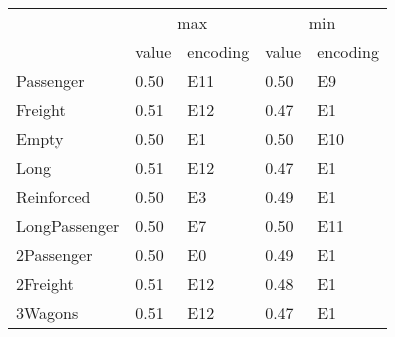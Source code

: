 \begin{tabular}{lllll}
\toprule
 & \multicolumn{2}{c}{max} & \multicolumn{2}{c}{min} \\
 & value & encoding & value & encoding \\
\midrule
Passenger & 0.50 & E11 & 0.50 & E9 \\
Freight & 0.51 & E12 & 0.47 & E1 \\
Empty & 0.50 & E1 & 0.50 & E10 \\
Long & 0.51 & E12 & 0.47 & E1 \\
Reinforced & 0.50 & E3 & 0.49 & E1 \\
LongPassenger & 0.50 & E7 & 0.50 & E11 \\
2Passenger & 0.50 & E0 & 0.49 & E1 \\
2Freight & 0.51 & E12 & 0.48 & E1 \\
3Wagons & 0.51 & E12 & 0.47 & E1 \\
\bottomrule
\end{tabular}
